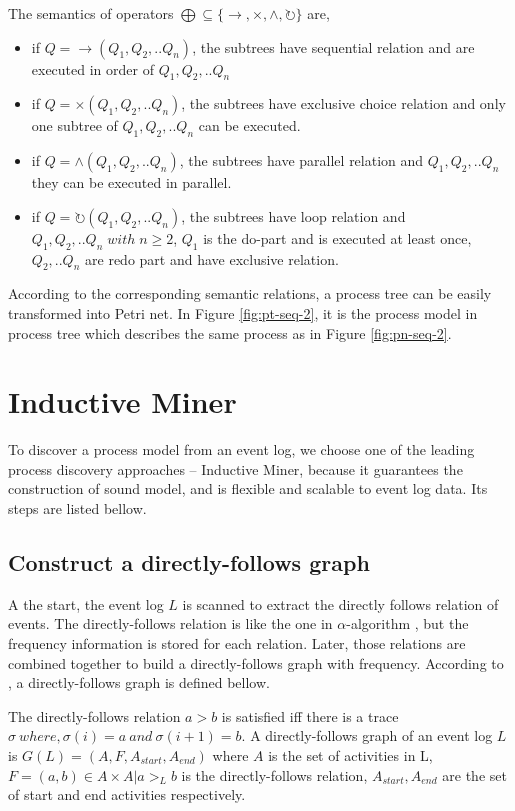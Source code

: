 \begin{definition} 
	The semantics of operators $\bigoplus \subseteq \{\rightarrow, \times, \land, \circlearrowright \}$ are,
	\begin{itemize}
		\item if $Q= \rightarrow(Q_1 , Q_2 ,.. Q_n)$, the subtrees have sequential relation and are executed in order of $Q_1,Q_2,..Q_n$
		\item if $Q= \times(Q_1 , Q_2 ,.. Q_n)$,  the subtrees have exclusive choice relation and only one subtree of $Q_1,Q_2,..Q_n$   can be executed.
		\item if $Q= \land (Q_1 , Q_2 ,.. Q_n)$,  the subtrees have parallel relation and $Q_1,Q_2,..Q_n$ they can be executed in parallel.
		\item if $Q= \circlearrowright(Q_1 , Q_2 ,.. Q_n)$,  the subtrees have loop relation and $Q_1,Q_2,..Q_n \; with\; n\geq2$, $Q_1$ is the do-part and is executed at least once, $Q_2,..Q_n$ are redo part and have exclusive relation.
	\end{itemize}
\end{definition}
According to the corresponding semantic relations,  a process tree can be easily transformed into Petri net. In Figure \ref{fig:pt-seq-2}, it is the process model in process tree which describes the same process as in Figure \ref{fig:pn-seq-2}. 
\section{Inductive Miner}
To discover a process model from an event log, we choose one of the leading process discovery approaches -- Inductive Miner, because it guarantees the construction of sound model, and is flexible and scalable to event log data. Its steps are listed bellow. 
\subsection{Construct a directly-follows graph}
A the start, the event log $L$ is scanned to extract the directly follows relation of events. The directly-follows relation is like the one in $\alpha$-algorithm \cite{van2004workflow, leemans2013discovering}, but the frequency information is stored for each relation. Later, those relations are combined together to build a directly-follows graph with frequency. According to \cite{van2016data, leemans2013discovering}, a directly-follows graph is defined bellow.
\begin{definition}
 The directly-follows relation $a > b$ is satisfied iff there is a trace $\sigma\ where, \sigma(i)=a \ and \ \sigma(i+1)=b$.
 A directly-follows graph of an event log $L$ is $G(L) = (A, F, A_{start}, A_{end}) $ where $A$ is the set of activities in L, $F={(a,b) \in A \times A | a >_L b} $ is the directly-follows relation, $A_{start}, A_{end}$ are the set of start and end activities respectively.
\end{definition}

